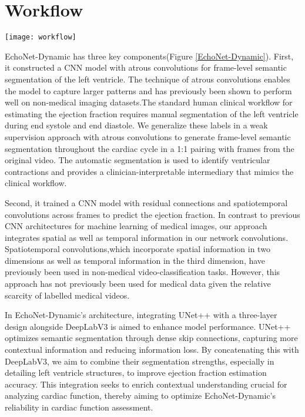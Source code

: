 
\vfill
\section{Workflow}

\begin{figure*}[h]
\centering
\texttt{[image: workflow]}
\caption{EchoNet-Dynamic architecture}
\label{EchoNet-Dynamic}
\end{figure*}

EchoNet-Dynamic has three key components(Figure \ref{EchoNet-Dynamic}). First, it constructed a CNN model with atrous convolutions for frame-level semantic segmentation of the left ventricle. The technique of atrous convolutions enables the model to capture larger patterns and has previously been shown to perform well on non-medical imaging datasets.The standard human clinical workflow for estimating the ejection fraction requires manual segmentation of the left ventricle during end systole and end diastole. We generalize these labels in a weak supervision approach with atrous convolutions to generate frame-level semantic segmentation throughout the cardiac cycle in a 1:1 pairing with frames from the original video. The automatic segmentation is used to identify ventricular contractions and provides a clinician-interpretable intermediary that mimics the clinical workflow.

Second, it trained a CNN model with residual connections and spatiotemporal convolutions across frames to predict the ejection fraction. In contrast to previous CNN architectures for machine learning of medical images, our approach integrates spatial as well as temporal information in our network convolutions. Spatiotemporal convolutions,which incorporate spatial information in two dimensions as well as temporal information in the third dimension, have previously been used in non-medical video-classification tasks. However, this approach has not previously been used for medical data given the relative scarcity of labelled medical videos.

In EchoNet-Dynamic's architecture, integrating UNet++ with a three-layer design alongside DeepLabV3 is aimed to enhance model performance. UNet++ optimizes semantic segmentation through dense skip connections, capturing more contextual information and reducing information loss. By concatenating this with DeepLabV3, we aim to combine their segmentation strengths, especially in detailing left ventricle structures, to improve ejection fraction estimation accuracy. This integration seeks to enrich contextual understanding crucial for analyzing cardiac function, thereby aiming to optimize EchoNet-Dynamic's reliability in cardiac function assessment.


